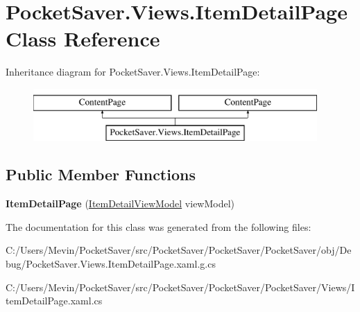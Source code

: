 \hypertarget{class_pocket_saver_1_1_views_1_1_item_detail_page}{}\section{Pocket\+Saver.\+Views.\+Item\+Detail\+Page Class Reference}
\label{class_pocket_saver_1_1_views_1_1_item_detail_page}
Inheritance diagram for Pocket\+Saver.\+Views.\+Item\+Detail\+Page\+:\begin{figure}[H]
\begin{center}
\leavevmode
\includegraphics[height=2.000000cm]{class_pocket_saver_1_1_views_1_1_item_detail_page}
\end{center}
\end{figure}
\subsection*{Public Member Functions}
\begin{DoxyCompactItemize}
\item 
\mbox{\label{class_pocket_saver_1_1_views_1_1_item_detail_page_ae6e0fbb25aceb544eb1c2c9a1e5abe9e}} 
{\bfseries Item\+Detail\+Page} (\hyperlink{class_pocket_saver_1_1_view_models_1_1_item_detail_view_model}{Item\+Detail\+View\+Model} view\+Model)
\end{DoxyCompactItemize}


The documentation for this class was generated from the following files\+:\begin{DoxyCompactItemize}
\item 
C\+:/\+Users/\+Mevin/\+Pocket\+Saver/src/\+Pocket\+Saver/\+Pocket\+Saver/\+Pocket\+Saver/obj/\+Debug/Pocket\+Saver.\+Views.\+Item\+Detail\+Page.\+xaml.\+g.\+cs\item 
C\+:/\+Users/\+Mevin/\+Pocket\+Saver/src/\+Pocket\+Saver/\+Pocket\+Saver/\+Pocket\+Saver/\+Views/Item\+Detail\+Page.\+xaml.\+cs\end{DoxyCompactItemize}

